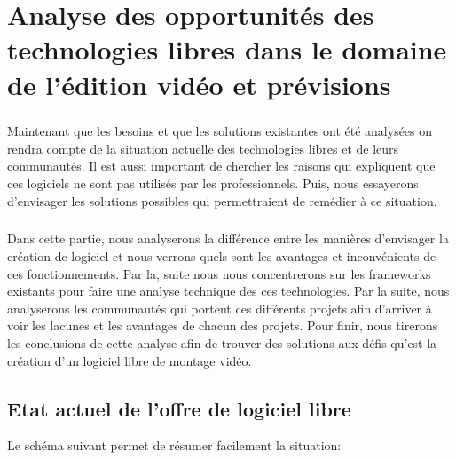 \chapter{Analyse des opportunités des technologies libres dans le
domaine de l'édition vidéo et prévisions}

\minitoc \newpage

\paragraph{}

Maintenant que les besoins et que les solutions existantes ont été
analysées on rendra compte de la situation actuelle des technologies
libres et de leurs communautés. Il est aussi important de chercher les
raisons qui expliquent que ces logiciels ne sont pas utilisés par les
professionnels. Puis, nous essayerons d'envisager les solutions possibles
qui permettraient de remédier à ce situation.

\paragraph{}

Dans cette partie, nous analyserons la différence entre les manières
d'envisager la création de logiciel et nous verrons quels sont les
avantages et inconvénients de ces fonctionnements. Par la, suite nous
nous concentrerons sur les frameworks existants pour faire une analyse
technique des ces technologies. Par la suite, nous analyserons les
communautés qui portent ces différents projets afin d'arriver à voir
les lacunes et les avantages de chacun des projets.  Pour finir, nous
tirerons les conclusions de cette analyse afin de trouver des solutions
aux défis qu'est la création d'un logiciel libre de montage vidéo.

\newpage

\section {Etat actuel de l'offre de logiciel libre}

Le schéma suivant permet de résumer facilement la situation:

